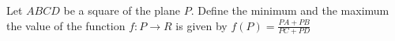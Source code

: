 Let $ABCD$ be a square of the plane $P$. Define the minimum and the maximum the value of the function $f: P \to R$ is given by $f (P) =\frac{PA + PB}{PC + PD}$